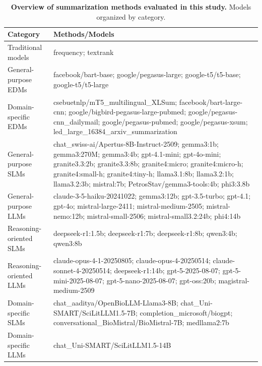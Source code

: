 \begin{table}[H]
\centering
\caption{\textbf{Overview of summarization methods evaluated in this study.} Models organized by category.}\label{tab:models}
\begin{tabularx}{\linewidth}{lX}
\toprule
\textbf{Category} & \textbf{Methods/Models} \\
\midrule
Traditional models & frequency; textrank \\
\midrule
General-purpose \acp{EDM} & facebook/bart-base; google/pegasus-large; google-t5/t5-base; google-t5/t5-large \\
\midrule
Domain-specific \acp{EDM} & csebuetnlp/mT5\_multilingual\_XLSum; facebook/bart-large-cnn; google/bigbird-pegasus-large-pubmed; google/pegasus-cnn\_dailymail; google/pegasus-pubmed; google/pegasus-xsum; led\_large\_16384\_arxiv\_summarization \\
\midrule
General-purpose \acp{SLM} & chat\_swiss-ai/Apertus-8B-Instruct-2509; gemma3:1b; gemma3:270M; gemma3:4b; gpt-4.1-mini; gpt-4o-mini; granite3.3:2b; granite3.3:8b; granite4:micro; granite4:micro-h; granite4:small-h; granite4:tiny-h; llama3.1:8b; llama3.2:1b; llama3.2:3b; mistral:7b; PetrosStav/gemma3-tools:4b; phi3:3.8b \\
\midrule
General-purpose \acp{LLM} & claude-3-5-haiku-20241022; gemma3:12b; gpt-3.5-turbo; gpt-4.1; gpt-4o; mistral-large-2411; mistral-medium-2505; mistral-nemo:12b; mistral-small-2506; mistral-small3.2:24b; phi4:14b \\
\midrule
Reasoning-oriented \acp{SLM} & deepseek-r1:1.5b; deepseek-r1:7b; deepseek-r1:8b; qwen3:4b; qwen3:8b \\
\midrule
Reasoning-oriented \acp{LLM} & claude-opus-4-1-20250805; claude-opus-4-20250514; claude-sonnet-4-20250514; deepseek-r1:14b; gpt-5-2025-08-07; gpt-5-mini-2025-08-07; gpt-5-nano-2025-08-07; gpt-oss:20b; magistral-medium-2509 \\
\midrule
Domain-specific \acp{SLM} & chat\_aaditya/OpenBioLLM-Llama3-8B; chat\_Uni-SMART/SciLitLLM1.5-7B; completion\_microsoft/biogpt; conversational\_BioMistral/BioMistral-7B; medllama2:7b \\
\midrule
Domain-specific \acp{LLM} & chat\_Uni-SMART/SciLitLLM1.5-14B \\
\bottomrule
\end{tabularx}
\end{table}

